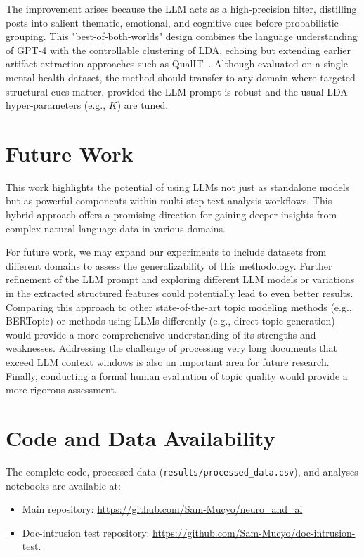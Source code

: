 \documentclass{article}
\begin{document}
The improvement arises because the LLM acts as a high‑precision filter, distilling posts into salient thematic, emotional, and cognitive cues before probabilistic grouping. This "best‑of‑both‑worlds" design combines the language understanding of GPT‑4 with the controllable clustering of LDA, echoing but extending earlier artifact‑extraction approaches such as QualIT~\citep{Bhaduri2024QualIT}. Although evaluated on a single mental‑health dataset, the method should transfer to any domain where targeted structural cues matter, provided the LLM prompt is robust and the usual LDA hyper‑parameters (e.g., $K$) are tuned.


\section{Future Work}

This work highlights the potential of using LLMs not just as standalone models but as powerful components within multi-step text analysis workflows. This hybrid approach offers a promising direction for gaining deeper insights from complex natural language data in various domains.

For future work, we may expand our experiments to include datasets from different domains to assess the generalizability of this methodology. Further refinement of the LLM prompt and exploring different LLM models or variations in the extracted structured features could potentially lead to even better results. Comparing this approach to other state-of-the-art topic modeling methods (e.g., BERTopic) or methods using LLMs differently (e.g., direct topic generation) would provide a more comprehensive understanding of its strengths and weaknesses. Addressing the challenge of processing very long documents that exceed LLM context windows is also an important area for future research. Finally, conducting a formal human evaluation of topic quality would provide a more rigorous assessment.



\section*{Code and Data Availability}
The complete code, processed data (\texttt{results/processed\_data.csv}), and analyses notebooks are available at:

\begin{itemize}
    \item Main repository: \url{https://github.com/Sam-Mucyo/neuro_and_ai}
    \item Doc-intrusion test repository: \url{https://github.com/Sam-Mucyo/doc-intrusion-test}.
\end{itemize}
\end{document}
